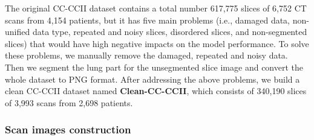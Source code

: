 \documentclass[letterpaper]{article}
\begin{document}
The original CC-CCII dataset contains a total number 617,775 slices of 6,752 CT scans from 4,154 patients, but it has five main problems (i.e., damaged data, non-unified data type, repeated and noisy slices, disordered slices, and non-segmented slices) that would have high negative impacts on the model performance. To solve these problems, we manually remove the damaged, repeated and noisy data. Then we segment the lung part for the unsegmented slice image and convert the whole dataset to PNG format. After addressing the above problems, we build a clean CC-CCII dataset named \textbf{Clean-CC-CCII}, which consists of 340,190 slices of 3,993 scans from 2,698 patients.





\subsubsection{Scan images construction}





\end{document}
